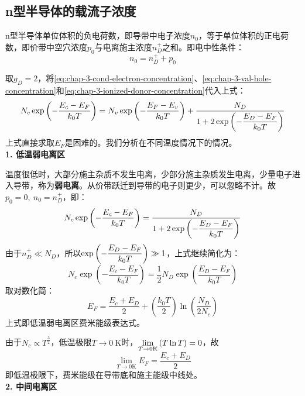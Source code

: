 \subsection{n型半导体的载流子浓度}

n型半导体单位体积的负电荷数，即导带中电子浓度$n_0$，等于单位体积的正电荷数，即价带中空穴浓度$p_0$与电离施主浓度$n_D^+$之和。即电中性条件：
\begin{equation}
    n_0=n_D^++p_0\label{eq:chap-3-n-type-semi-neutrality}
\end{equation}

取$g_D=2$，将\autoref{eq:chap-3-cond-electron-concentration}、\autoref{eq:chap-3-val-hole-concentration}和\autoref{eq:chap-3-ionized-donor-concentration}代入上式：
\begin{equation}
    N_c\exp{\left(-\frac{E_c-E_F}{k_0T}\right)}=N_v\exp{\left(-\frac{E_F-E_v}{k_0T}\right)}+\frac{N_D}{\displaystyle 1+2\exp{\left(-\frac{E_D-E_F}{k_0T}\right)}}\label{eq:chap-3-n-type-neutral-equation}
\end{equation}
上式直接求取$E_F$是困难的。我们分析在不同温度情况下的情况。\vspace{1ex} \\
\textbf{1. 低温弱电离区}\vspace{1ex}

温度很低时，大部分施主杂质不发生电离，少部分施主杂质发生电离，少量电子进入导带，称为\textbf{弱电离}。从价带跃迁到导带的电子则更少，可以忽略不计。故$p_0=0,\ n_0=n_D^+$，即：
\begin{equation}
    N_c\exp{\left(-\frac{E_c-E_F}{k_0T}\right)}=\frac{N_D}{\displaystyle 1+2\exp{\left(-\frac{E_D-E_F}{k_0T}\right)}}
\end{equation}
\vspace{1ex}由于$n_D^+\ll N_D$，所以$\displaystyle \exp{\left(-\frac{E_D-E_F}{k_0T}\right)}\gg 1$，上式继续简化为：
\begin{equation}
    N_c\exp{\left(-\frac{E_c-E_F}{k_0T}\right)}=\frac{1}{2}N_D\exp{\left(\frac{E_D-E_F}{k_0T}\right)}
\end{equation}
取对数化简：
\begin{equation}
    E_F=\frac{E_c+E_D}{2}+\left(\frac{k_0T}{2}\right)\ln{\left(\frac{N_D}{2N_c}\right)}\label{eq:chap-3-low-T-weak-ionize-fermi-energy}
\end{equation}
上式即低温弱电离区费米能级表达式。

\vspace{1ex}由于$N_c\propto T^\frac{3}{2}$，低温极限$T\rightarrow 0\ \mathrm{K}$时，$\displaystyle \lim_{T\rightarrow 0 \mathrm{K}}\left(T\ln{T}\right)=0$，故
\begin{equation}
    \lim_{T\rightarrow 0\mathrm{K}}E_F=\frac{E_c+E_D}{2}
\end{equation}
即低温极限下，费米能级在导带底和施主能级中线处。\vspace{1ex} \\
\textbf{2. 中间电离区}\vspace{1ex}

